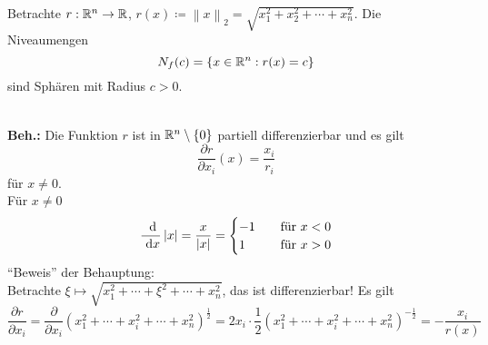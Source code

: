 \begin{example}
	Betrachte $ r : \mathbb{R} ^n \to \mathbb{R}  $, $ r(x) \coloneqq  \left\| x \right\| _2 = \sqrt{x_1^2 + x_2^2 + \dotsb + x_n^2}  $.
	Die Niveaumengen
	\[
		N_f(c) = \left\{ x \in \mathbb{R} ^n : r(x) = c \right\} 
	\]
	sind Sphären mit Radius $ c > 0 $.\\
	\\
	\textbf{Beh.:} Die Funktion $ r $ ist in $ \mathbb{R} ^n \setminus \left\{ 0 \right\}  $ partiell differenzierbar und es gilt
	\[
		\frac{\partial r}{ \partial x_i } (x) = \frac{x_i}{ r_i } 
	\]
	für $ x \neq 0 $.\\
	Für $ x \neq 0 $ 
	\[
		\frac{ ~\text{d} }{ ~\text{d} x } \left| x \right| = \frac{ x }{ \left| x \right|  } = \begin{cases}
			-1 & \quad \text{für $ x < 0 $} \\
			1 & \quad \text{für $ x > 0 $} 
		\end{cases}
	\]
	``Beweis'' der Behauptung:\\
	Betrachte $ \xi \mapsto \sqrt{x_1^2 + \dotsb + \xi^2 + \dotsb + x_n^2}  $, das ist differenzierbar! 
	Es gilt
	\[
		\frac{ \partial r }{ \partial x_i } = \frac{ \partial }{ \partial x_i } (x_1^2 + \dotsb + x_i^2 + \dotsb + x_n^2)^{\frac{ 1 }{ 2 } } = 2x_i \cdot \frac{ 1 }{ 2 } \left( x_1^2 + \dotsb + x_i^2 + \dotsb + x_n^2 \right) ^{-\frac{ 1 }{ 2 } } = - \frac{x_i}{ r(x) } 
	\]
\end{example}

